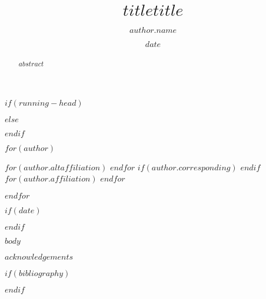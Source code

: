 \documentclass{JASA-EL}
\begin{document}
$if(running-head)$
\title[JASA-EL/$running-head$]{$title$}
$else$
\title[JASA-EL/$title$]{$title$}
$endif$


$for(author)$
\author{$author.name$}
$for(author.altaffiliation)$
$endfor$
$if(author.corresponding)$
\correspondingauthor
$endif$
$for(author.affiliation)$
$endfor$

$endfor$




$if(date)$
\date{$date$}
$endif$

\begin{abstract}
$abstract$
\end{abstract}


\maketitle


$body$


\begin{acknowledgments}
$acknowledgements$
\end{acknowledgments}




$if(bibliography)$

$endif$



% 

\end{document}
